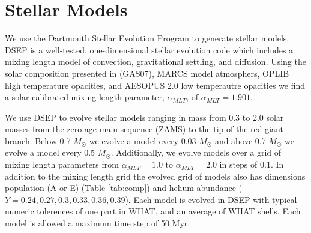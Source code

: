 \section{Stellar Models}\label{sec:modeling}
We use the Dartmouth Stellar Evolution Program \citep[DSEP, ][]{Dotter2008} to
generate stellar models. DSEP is a well-tested, one-dimensional stellar
evolution code which includes a mixing length model of convection,
gravitational settling, and diffusion. Using the solar composition presented in
\citep{Grevesse2007} (GAS07), MARCS model atmosphers, OPLIB high temperature
opacities, and AESOPUS 2.0 low temperautre opacities we find a solar calibrated
mixing length parameter, $\alpha_{MLT}$, of $\alpha_{MLT} = 1.901$.

We use DSEP to evolve stellar models ranging in mass from 0.3 to 2.0 solar
masses from the zero-age main sequence (ZAMS) to the tip of the red giant
branch. Below 0.7 $M_{\odot}$ we evolve a model every 0.03 $M_{\odot}$ and
above 0.7 $M_{\odot}$ we evolve a model every 0.5 $M_{\odot}$. Additionally, we
evolve models over a grid of mixing length parameters from $\alpha_{MLT} = 1.0$
to $\alpha_{MLT} = 2.0$ in steps of 0.1. In addition to the mixing length grid
the evolved grid of models also has dimensions population (A or E) (Table
\ref{tab:comp}) and helium abundance ($Y=0.24, 0.27, 0.3, 0.33, 0.36, 0.39$).
Each model is evolved in DSEP with typical numeric tolerences of one part in
{\color{red}WHAT}, and an average of {\color{red} WHAT} shells. Each model is
allowed a maximum time step of 50 Myr. 

